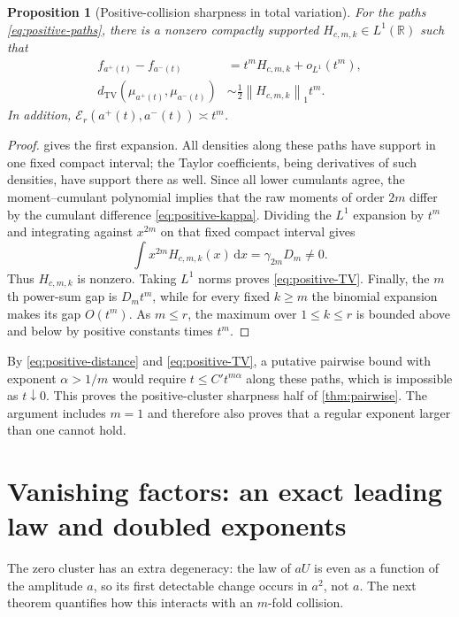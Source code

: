 \documentclass[11pt,a4paper]{article}
\numberwithin{equation}{section}
\newtheorem{proposition}[proposition]{Proposition}
\theoremstyle{definition}
\theoremstyle{remark}
\newcommand{\R}{\mathbb R}
\newcommand{\TV}{d_{\mathrm{TV}}}
\newcommand{\dd}{\,\mathrm d}
\newcommand{\norm}[1]{\left\lVert#1\right\rVert}
\newcommand{\err}{\mathcal E_r}
\begin{document}
\begin{proposition}[Positive-collision sharpness in total variation]
\label{prop:positive-sharp}
For the paths \eqref{eq:positive-paths}, there is a nonzero compactly supported
$H_{c,m,k}\in L^1(\R)$ such that
\begin{align}
 f_{a^+(t)}-f_{a^-(t)}
 &=t^mH_{c,m,k}+o_{L^1}(t^m),
 \label{eq:positive-density}\\
 \TV(\mu_{a^+(t)},\mu_{a^-(t)})
 &\sim\frac12\norm{H_{c,m,k}}_1t^m.
 \label{eq:positive-TV}
\end{align}
In addition, $\err(a^+(t),a^-(t))\asymp t^m$.
\end{proposition}
\begin{proof}
 gives the first expansion.  All densities along these
paths have support in one fixed compact interval; the Taylor coefficients,
being derivatives of such densities, have support there as well.
Since all lower cumulants agree, the moment--cumulant polynomial implies that
the raw moments of order $2m$ differ by the cumulant difference
\eqref{eq:positive-kappa}.  Dividing the $L^1$ expansion by $t^m$ and integrating
against $x^{2m}$ on that fixed compact interval gives
\[
 \int x^{2m}H_{c,m,k}(x)\dd x=\gamma_{2m}D_m\ne0.
\]
Thus $H_{c,m,k}$ is nonzero.  Taking $L^1$ norms proves
\eqref{eq:positive-TV}.  Finally, the $m$th power-sum gap is $D_mt^m$, while
for every fixed $k\ge m$ the binomial expansion makes its gap $O(t^m)$.
As $m\le r$, the maximum over $1\le k\le r$ is bounded above and below by
positive constants times $t^m$.
\end{proof}

By \eqref{eq:positive-distance} and \eqref{eq:positive-TV}, a putative pairwise
bound with exponent $\alpha>1/m$ would require
$t\le C't^{m\alpha}$ along these paths, which is impossible as $t\downarrow0$.
This proves the positive-cluster sharpness half of \cref{thm:pairwise}.
The argument includes $m=1$ and therefore also proves that a regular exponent
larger than one cannot hold.

\section{Vanishing factors: an exact leading law and doubled exponents}
\label{sec:zero-sharp}

The zero cluster has an extra degeneracy: the law of $aU$ is even as a function
of the amplitude $a$, so its first detectable change occurs in $a^2$, not $a$.
The next theorem quantifies how this interacts with an $m$-fold collision.
\end{document}

